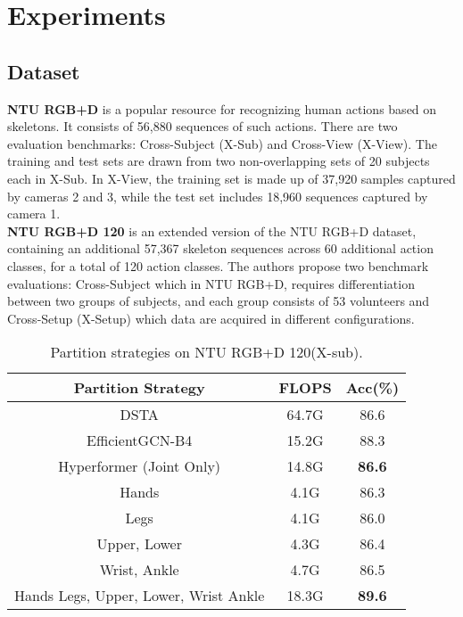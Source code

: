 \documentclass{bmvc2k}
\begin{document}
\section{Experiments}


\subsection{Dataset}
\textbf{NTU RGB+D} \cite{Shahroudy_2016_CVPR} is a popular resource for recognizing human actions based on skeletons. It consists of 56,880 sequences of such actions.
There are two evaluation benchmarks: Cross-Subject (X-Sub) and Cross-View (X-View).
The training and test sets are drawn from two non-overlapping sets of 20 subjects each in X-Sub. In X-View, the training set is made up of 37,920 samples captured by cameras 2 and 3, while the test set includes 18,960 sequences captured by camera 1. \\
\textbf{NTU RGB+D 120} \cite{Liu2019-on} is an extended version of the NTU RGB+D dataset, containing an additional 57,367 skeleton sequences across 60 additional action classes, for a total of 120 action classes. The authors propose two benchmark evaluations: Cross-Subject which in NTU RGB+D, requires differentiation between two groups of subjects, and each group consists of 53 volunteers and Cross-Setup (X-Setup) which data are acquired in different configurations.

\begin{table}[]
\caption{Partition strategies on NTU RGB+D 120(X-sub).}
\label{table:data_type1}
\centering
\small
\begin{tabular}{ccc}
\hline
Partition Strategy                              & FLOPS & Acc(\%)       \\ \hline
DSTA \cite{dstanet_accv2020}                    & 64.7G & 86.6          \\
EfficientGCN-B4 \cite{song2022constructing}     & 15.2G & 88.3          \\
Hyperformer (Joint Only) \cite{Yuxuan_2023}     & 14.8G & \textbf{86.6} \\
Hands                                           & 4.1G  & 86.3          \\
Legs                                            & 4.1G  & 86.0          \\
Upper, Lower                                    & 4.3G  & 86.4          \\
Wrist, Ankle                                    & 4.7G  & 86.5          \\
Hands Legs, Upper, Lower, Wrist Ankle           & 18.3G & \textbf{89.6} \\ \hline
\end{tabular}
\label{table-body-part}
\end{table}
\end{document}
